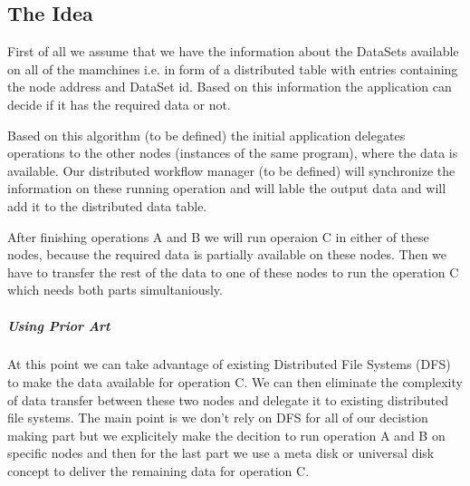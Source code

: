 \subsection{The Idea}
First of all we assume that we have the information about the DataSets
available on all of the mamchines i.e. in form of a distributed table
with entries containing the node address and DataSet id. Based on this
information the application can decide if it has the required data or
not. 

Based on this algorithm (to be defined) the initial application
delegates operations to the other nodes (instances of the same program),
where the data is available. Our distributed workflow manager (to be 
defined) will synchronize the information on these running operation and
will lable the output data and will add it to the distributed data table.

After finishing operations A and B we will run operaion C in either
of these nodes, because the required data is partially available on these
nodes. Then we have to transfer the rest of the data to one of these
nodes to run the operation C which needs both parts simultaniously.

\subparagraph{Using Prior Art}
At this point we can take advantage of existing Distributed File Systems
(DFS) to make the data available for operation C. We can then eliminate
the complexity of data transfer between these two nodes and delegate it
to existing distributed file systems. The main point is we don't rely on
DFS for all of our decistion making part but we explicitely make the 
decition to run operation A and B on specific nodes and then for the 
last part we use a meta disk or universal disk concept to deliver the
remaining data for operation C.